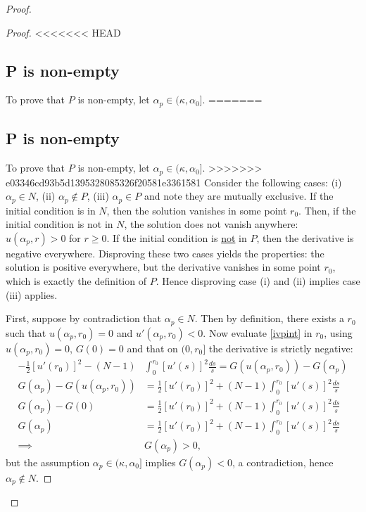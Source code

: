 \begin{lemma}
\begin{proof}
\begin{proof}
<<<<<<< HEAD
\subsection*{P is non-empty}
To prove that $P$ is non-empty, let $\alpha_p\in(\kappa,\alpha_0]$.
=======
\subsection*{P is non-empty} 
To prove that $P$ is non-empty, let $\alpha_p\in(\kappa,\alpha_0]$. 
>>>>>>> e03346cd93b5d1395328085326f20581e3361581
Consider the following cases: (i) $\alpha_p\in N$, (ii) $\alpha_p\notin P$, (iii) $\alpha_p\in P$ and note they are mutually exclusive. If the initial condition is in $N$, then the solution vanishes in some point $r_0$. Then, if the initial condition is not in $N$, the solution does not vanish anywhere: $u(\alpha_p,r)>0$ for $r\geq0$. If the initial condition is \underline{not} in $P$, then the derivative is negative everywhere. Disproving these two cases yields the properties: the solution is positive everywhere, but the derivative vanishes in some point $r_0$, which is exactly the definition of $P$. %
Hence disproving case (i) and (ii) implies case (iii) applies.

First, suppose by contradiction that $\alpha_p\in N$. Then by definition, there exists a $r_0$ such that $u(\alpha_p,r_0)=0$ and $u'(\alpha_p,r_0)<0$. Now evaluate \eqref{ivpint} in $r_0$, using $u(\alpha_p,r_0)=0$, $G(0)=0$ and that on $(0,r_0]$ the derivative is strictly negative:
\begin{align*}-\frac{1}{2}[u'(r_0)]^2-(N-1)&\int_0^{r_0}[u'(s)]^2\frac{ds}{s}=G(u(\alpha_p,r_0))-G(\alpha_p)\\
G(\alpha_p)-G(u(\alpha_p,r_0))&=\frac{1}{2}[u'(r_0)]^2+(N-1)\int_0^{r_0}[u'(s)]^2\frac{ds}{s}\\
G(\alpha_p)-G(0)&=\frac{1}{2}[u'(r_0)]^2+(N-1)\int_0^{r_0}[u'(s)]^2\frac{ds}{s}\\
G(\alpha_p)&=\frac{1}{2}[u'(r_0)]^2+(N-1)\int_0^{r_0}[u'(s)]^2\frac{ds}{s}\\
    \implies &G(\alpha_p)>0,
\end{align*}
but the assumption $\alpha_p\in(\kappa,\alpha_0]$ implies $G(\alpha_p)<0$, a contradiction, hence $\alpha_p\notin N$.


\end{proof}
\end{proof}
\end{lemma}
